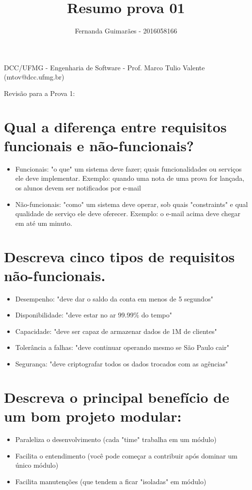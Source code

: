 \documentclass[11pt]{article}
\author{Fernanda Guimarães - 2016058166}
\date{}
\title{Resumo prova 01}
\begin{document}
\maketitle
DCC/UFMG - Engenharia de Software - Prof. Marco Tulio Valente (mtov@dcc.ufmg.br)

Revisão para a Prova 1:

\section{Qual a diferença entre requisitos funcionais e não-funcionais?}
\label{sec:org21db323}
\begin{itemize}
\item Funcionais: "o que" um sistema deve fazer; quais funcionalidades ou serviços ele deve
implementar. Exemplo: quando uma nota de uma prova for lançada, os alunos devem ser
notificados por e-mail
\item Não-funcionais: "como" um sistema deve operar, sob quais "constraints" e qual
qualidade de serviço ele deve oferecer. Exemplo: o e-mail acima deve chegar em até um
minuto.
\end{itemize}
\section{Descreva cinco tipos de requisitos não-funcionais.}
\label{sec:org2fd4326}
\begin{itemize}
\item Desempenho: "deve dar o saldo da conta em menos de 5 segundos"
\item Disponibilidade: "deve estar no ar 99.99\% do tempo"
\item Capacidade: "deve ser capaz de armazenar dados de 1M de clientes"
\item Tolerância a falhas: "deve continuar operando mesmo se São Paulo cair"
\item Segurança: "deve criptografar todos os dados trocados com as agências"
\end{itemize}

\section{Descreva o principal benefício de um bom projeto modular:}
\label{sec:org97abdd6}
\begin{itemize}
\item Paraleliza o desenvolvimento (cada "time" trabalha em um módulo)
\item Facilita o entendimento (você pode começar a contribuir após dominar um único módulo)
\item Facilita manutenções (que tendem a ficar "isoladas" em módulo)
\end{itemize}
\end{document}
